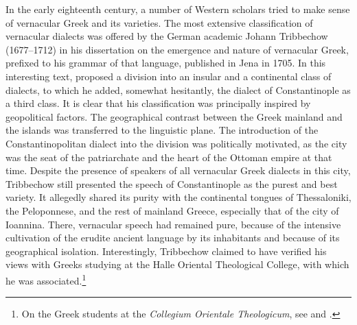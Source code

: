 {In the early eighteenth century, a number of Western scholars tried to make sense of vernacular Greek and its varieties. The most extensive classification of vernacular dialects was offered by the German academic Johann Tribbechow (1677–1712) in his dissertation on the emergence and nature of vernacular Greek, prefixed to his grammar of that language, published in Jena in 1705. In this interesting text, \citet[a.4\textsc{\textsuperscript{r}}\textsc{–}a.4\textsc{\textsuperscript{v}}]{Tribbechow1705} proposed a division into an insular and a continental class of dialects, to which he added, somewhat hesitantly, the dialect of Constantinople as a third class. It is clear that his classification was principally inspired by geopolitical factors. The geographical contrast between the Greek mainland and the islands was transferred to the linguistic plane. The introduction of the Constantinopolitan dialect into the division was politically motivated, as the city was the seat of the patriarchate and the heart of the Ottoman empire at that time. Despite the presence of speakers of all vernacular Greek dialects in this city, Tribbechow still presented the speech of Constantinople as the purest and best variety. It allegedly shared its purity with the continental tongues of Thessaloniki, the Peloponnese, and the rest of mainland Greece, especially that of the city of Ioannina. There, vernacular speech had remained pure, because of the intensive cultivation of the erudite ancient language by its inhabitants and because of its geographical isolation. Interestingly, Tribbechow claimed to have verified his views with Greeks studying at the Halle Oriental Theological College, with which he was associated.\footnote{On the Greek students at the \textit{Collegium Orientale Theologicum}, see \citet{Moennig1998} and \citet[283]{Makrides2006}.}

}
